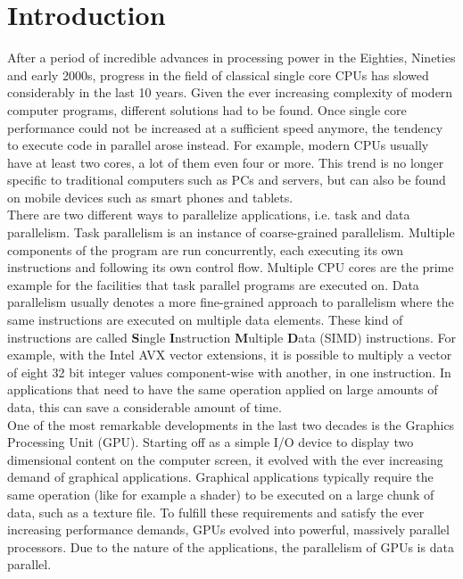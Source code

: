 
\chapter{Introduction}
\label{chap:intro}
After a period of incredible advances in processing power in the Eighties, Nineties and early 2000s, progress in the field of classical single core CPUs has slowed considerably in the last 10 years. Given the ever increasing complexity of modern computer programs, different solutions had to be found. Once single core performance could not be increased at a sufficient speed anymore, the tendency to execute code in parallel arose instead. For example, modern CPUs usually have at least two cores, a lot of them even four or more. This trend is no longer specific to traditional computers such as PCs and servers, but can also be found on mobile devices such as smart phones and tablets. \\

There are two different ways to parallelize applications, i.e. task and data parallelism. Task parallelism is an instance of coarse-grained parallelism. Multiple components of the program are run concurrently, each executing its own instructions and following its own control flow. Multiple CPU cores are the prime example for the facilities that task parallel programs are executed on. Data parallelism usually denotes a more fine-grained approach to parallelism where the same instructions are executed on multiple data elements. These kind of instructions are called \textbf{S}ingle \textbf{I}nstruction \textbf{M}ultiple \textbf{D}ata (SIMD) instructions. For example, with the Intel AVX vector extensions, it is possible to  multiply a vector of eight 32 bit integer values component-wise with another, in one instruction. In applications that need to have the same operation applied on large amounts of data, this can save a considerable amount of time. \\ 

One of the most remarkable developments in the last two decades is the Graphics Processing Unit (GPU). Starting off as a simple I/O device to display two dimensional content on the computer screen, it evolved with the ever increasing demand of graphical applications. Graphical applications typically require the same operation (like for example a shader) to be executed on a large chunk of data, such as a texture file. To fulfill these requirements and satisfy the ever increasing performance demands, GPUs evolved into powerful, massively parallel processors. Due to the nature of the applications, the parallelism of GPUs is data parallel. \cite{blythe2008rise,jalili2010simd} \\

